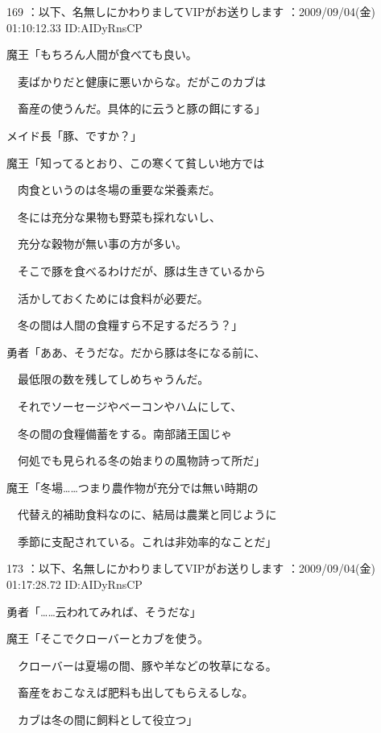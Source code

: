 \documentclass[a4j,twocolumn]{tarticle}
\begin{document}
	

	

169 ：以下、名無しにかわりましてVIPがお送りします ：2009/09/04(金) 01:10:12.33 ID:AIDyRnsCP 


魔王「もちろん人間が食べても良い。\par{} 
　麦ばかりだと健康に悪いからな。だがこのカブは\par{} 
　畜産の使うんだ。具体的に云うと豚の餌にする」 



メイド長「豚、ですか？」 



魔王「知ってるとおり、この寒くて貧しい地方では\par{} 
　肉食というのは冬場の重要な栄養素だ。\par{} 
　冬には充分な果物も野菜も採れないし、\par{} 
　充分な穀物が無い事の方が多い。\par{} 
　そこで豚を食べるわけだが、豚は生きているから\par{} 
　活かしておくためには食料が必要だ。\par{} 
　冬の間は人間の食糧すら不足するだろう？」 



勇者「ああ、そうだな。だから豚は冬になる前に、\par{} 
　最低限の数を残してしめちゃうんだ。\par{} 
　それでソーセージやベーコンやハムにして、\par{} 
　冬の間の食糧備蓄をする。南部諸王国じゃ\par{} 
　何処でも見られる冬の始まりの風物詩って所だ」



魔王「冬場……つまり農作物が充分では無い時期の\par{} 
　代替え的補助食料なのに、結局は農業と同じように\par{} 
　季節に支配されている。これは非効率的なことだ」 

	
    
    

173 ：以下、名無しにかわりましてVIPがお送りします ：2009/09/04(金) 01:17:28.72 ID:AIDyRnsCP 


勇者「……云われてみれば、そうだな」 



魔王「そこでクローバーとカブを使う。\par{} 
　クローバーは夏場の間、豚や羊などの牧草になる。\par{} 
　畜産をおこなえば肥料も出してもらえるしな。\par{} 
　カブは冬の間に飼料として役立つ」 
\end{document}
